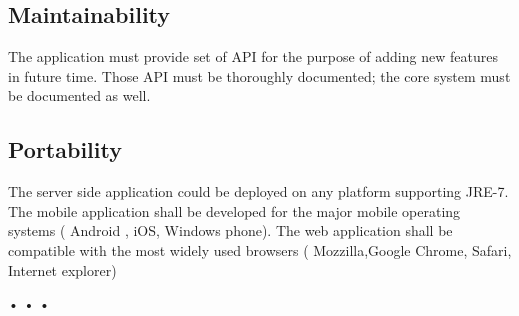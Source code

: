   \subsection{Maintainability}
  The application must provide set of API for the purpose of adding new features in future time.
  Those API must be thoroughly documented; the core system must be documented as well.
  \subsection{Portability}
  The server side application could be deployed on any platform supporting JRE-7.\\
  The mobile application shall be developed for the major mobile operating systems ( Android , iOS, Windows phone).
  The web application shall be compatible with the most widely used browsers ( Mozzilla,Google Chrome, Safari, Internet explorer) %
  
 • • •
                                                                                                                                                                                                                                                                                                                                                                                                                                                                                                                                                                                                                                                                                                                                                                                                                                                                                                                                                                                                                                                                                                                  

